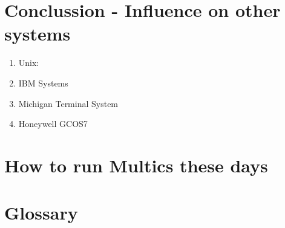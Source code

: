 
\section{Conclussion - Influence on other systems}
\begin{enumerate}
    \item Unix:

    \item IBM Systems
    
    \item Michigan Terminal System
    
    \item Honeywell GCOS7
\end{enumerate}


\section{How to run Multics these days}


\section{Glossary}
